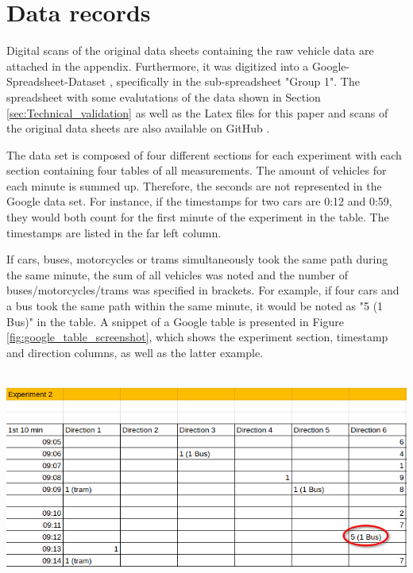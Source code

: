 \section{Data records}
\label{sec:Data_records}
Digital scans of the original data sheets containing the raw vehicle data are attached in the appendix. Furthermore, it was digitized into a Google-Spreadsheet-Dataset \cite{dataset_google_sheets}, specifically in the sub-spreadsheet "Group 1". The spreadsheet with some evalutations of the data shown in Section \ref{sec:Technical_validation} as well as the Latex files for this paper and scans of the original data sheets are also available on GitHub \cite{github}.

The data set is composed of four different sections for each experiment with each section containing four tables of all measurements. The amount of vehicles for each minute is summed up. Therefore, the seconds are not represented in the Google data set. For instance, if the timestamps for two cars are 0:12 and 0:59, they would both count for the first minute of the experiment in the table. The timestamps are listed in the far left column. 

If cars, buses, motorcycles or trams simultaneously took the same path during the same minute, the sum of all vehicles was noted and the number of buses/motorcycles/trams was specified in brackets. For example, if four cars and a bus took the same path within the same minute, it would be noted as "5 (1 Bus)" in the table. A snippet of a Google table is presented in Figure \ref{fig:google_table_screenshot}, which shows the experiment section, timestamp and direction columns, as well as the latter example.

~\\
\includegraphics[width=0.95\linewidth]{Screenshot_20220613_112904.png}
\label{fig:google_table_screenshot}
